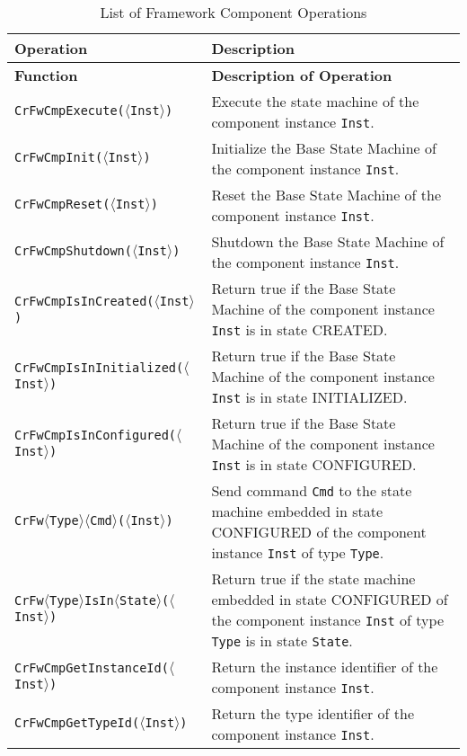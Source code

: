\documentclass{pnp_article}
\begin{document}
\begin{longtable}{|p{5.5cm}|p{7.7cm}|}
\caption{List of Framework Component Operations} \label{tab:CmpOperations}\\
\hline
\rowcolor{light-gray}
\textbf{Operation} & \textbf{Description} \\
\hline\hline
\endfirsthead
\rowcolor{light-gray}
\textbf{Function} & \textbf{Description of Operation} \\
\hline\hline
\endhead
\texttt{CrFwCmpExecute($\langle$Inst$\rangle$)} & Execute the state machine of the component instance \texttt{Inst}. \\
\hline
\texttt{CrFwCmpInit($\langle$Inst$\rangle$)} & Initialize the Base State Machine of the component instance \texttt{Inst}. \\
\hline
\texttt{CrFwCmpReset($\langle$Inst$\rangle$)} & Reset the Base State Machine of the component instance \texttt{Inst}. \\
\hline
\texttt{CrFwCmpShutdown($\langle$Inst$\rangle$)} & Shutdown the Base State Machine of the component instance \texttt{Inst}. \\
\hline
\texttt{CrFwCmpIsInCreated($\langle$Inst$\rangle$)} & Return true if the Base State Machine of the component instance \texttt{Inst} is in state CREATED. \\
\hline
\texttt{CrFwCmpIsInInitialized($\langle$Inst$\rangle$)} & Return true if the Base State Machine of the component instance \texttt{Inst} is in state INITIALIZED. \\
\hline
\texttt{CrFwCmpIsInConfigured($\langle$Inst$\rangle$)} & Return true if the Base State Machine of the component instance \texttt{Inst} is in state CONFIGURED. \\
\hline
\texttt{CrFw$\langle$Type$\rangle\langle$Cmd$\rangle$($\langle$Inst$\rangle$)} & Send command \texttt{Cmd} to the state machine embedded in state CONFIGURED of the component instance \texttt{Inst} of type \texttt{Type}. \\
\hline
\texttt{CrFw$\langle$Type$\rangle$IsIn$\langle$State$\rangle$($\langle$Inst$\rangle$)} & Return true if the state machine embedded in state CONFIGURED of the component instance \texttt{Inst} of type \texttt{Type} is in state \texttt{State}. \\
\hline
\texttt{CrFwCmpGetInstanceId($\langle$Inst$\rangle$)} & Return the instance identifier of the component instance \texttt{Inst}. \\
\hline
\texttt{CrFwCmpGetTypeId($\langle$Inst$\rangle$)} & Return the type identifier of the component instance \texttt{Inst}. \\
\hline
\end{longtable}
\end{document}
